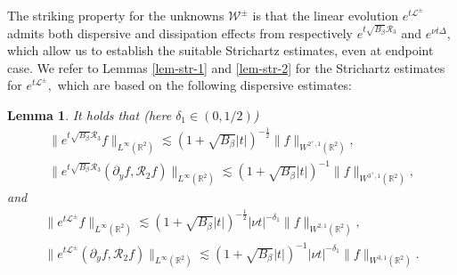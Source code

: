 \documentclass[11pt,reqno]{article}
\newtheorem{lemm}[theo]{Lemma}
\numberwithin{equation}{section}
\newcommand\R{{\mathbb R}}
\newcommand\W{{\mathcal W}}
\newcommand\up{\upsilon}
\newcommand\uu{\bm{u}}
\newcommand\FF{\bm{F}}
\let\pa=\partial
\let\f=\frac
\def \cR {\mathcal{R}}
\begin{document}
The striking property for the unknowns $\W^{\pm}$ %
is that the linear evolution 
$e^{t\mathcal{L}^{\pm}}$
admits both dispersive and dissipation effects from respectively $e^{t\sqrt{B_{\beta}}\cR_3}$  and 
$e^{\nu t\Delta},$ which allow us to establish the suitable Strichartz estimates, even at endpoint case. 
We refer to
Lemmas \ref{lem-str-1} and \ref{lem-str-2} for the Strichartz estimates for $e^{t\mathcal{L}^{\pm}},$ which are based on the following dispersive estimates: 
\begin{lemm}\label{lemm-disp}
It holds that (here $\delta_1\in(0,1/2) $)
\begin{align*}	
\|e^{t\sqrt{B_{\beta}}\cR_3}f\|_{L^{\infty}(\R^2)}	\lesssim (1+\sqrt{B_{\beta}}|t|)^{-\f12} \|f\|_{W^{2^+,1}(\R^2)},\\
\|e^{t\sqrt{B_{\beta}}\cR_3}(\pa_yf,\cR_2f)\|_{L^{\infty}(\R^2)}	\lesssim (1+\sqrt{B_{\beta}}|t|)^{-1} \|f\|_{W^{3^+,1}(\R^2)},
\end{align*}
and
\begin{align*}	
\|e^{t\mathcal{L}^{\pm}}f\|_{L^{\infty}(\R^2)}	\lesssim (1+\sqrt{B_{\beta}}|t|)^{-\f12}|\nu t|^{-\delta_1} \|f\|_{W^{2,1}(\R^2)},\\
\|e^{t\mathcal{L}^{\pm}}(\pa_yf,\cR_2f)\|_{L^{\infty}(\R^2)}	\lesssim (1+\sqrt{B_{\beta}}|t|)^{-1}|\nu t|^{-\delta_1} \|f\|_{W^{3,1}(\R^2)}.
\end{align*}
\end{lemm}
\end{document}
